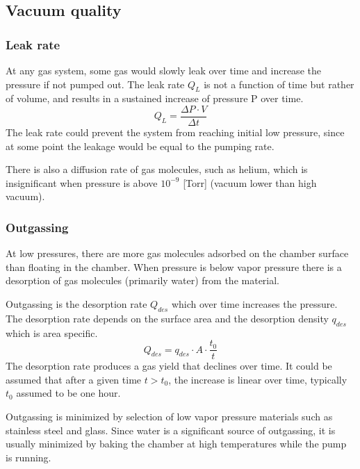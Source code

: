 \documentclass[\main/master.tex]{subfiles}
\begin{document}
\subsection{Vacuum quality}
\subsubsection{Leak rate}
At any gas system, some gas would slowly leak over time and increase the pressure if not pumped out. The leak rate $Q_L$ is not a function of time but rather of volume, and results in a sustained increase of pressure P over time.
\begin{equation}
Q_L = \frac{\Delta P\cdot V}{\Delta t}  \label{eqn:energy-mass-equivalence-relation}
\end{equation}
The leak rate could prevent the system from reaching initial low pressure, since at some point the leakage would be equal to the pumping rate.
\par\noindent
There is also a diffusion rate of gas molecules, such as helium, which is insignificant when pressure is above $10^{-9}$ [Torr] (vacuum lower than high vacuum). 

\subsubsection{Outgassing}
\par\noindent
At low pressures, there are more gas molecules adsorbed on the chamber surface than floating in the chamber. When pressure is below vapor pressure there is a desorption of gas molecules (primarily water) from the material.
\par\noindent
Outgassing is the desorption rate $Q_{des}$ which over time increases the pressure. The desorption rate depends on the surface area and the desorption density $q_{des}$ which is area specific. 
\begin{equation}
Q_{des} = q_{des}\cdot A\cdot\frac{t_0}{t}  \label{eqn:energy-mass-equivalence-relation}
\end{equation}
The desorption rate produces a gas yield that declines over time. It could be assumed that after a given time $t>t_0$, the increase is linear over time, typically $t_0$ assumed to be one hour.
\par\noindent
Outgassing is minimized by selection of low vapor pressure materials such as stainless steel and glass. Since water is a significant source of outgassing, it is usually minimized by baking the chamber at high temperatures while the pump is running.
\end{document}

